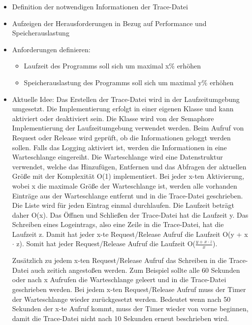 \begin{itemize}
    \item Definition der notwendigen Informationen der Trace-Datei
    \item Aufzeigen der Herausforderungen in Bezug auf Performance und
    Speicherauslastung
  \item Anforderungen definieren:
  \begin{itemize}
    \item Laufzeit des Programms soll sich um maximal x\% erhöhen
    \item Speicherauslastung des Programms soll sich um maximal y\% erhöhen
  \end{itemize}
    \item Aktuelle Idee: Das Erstellen der Trace-Datei wird in der
    Laufzeitumgebung umgesetzt. Die Implementierung erfolgt in einer eigenen
    Klasse und kann aktiviert oder deaktiviert sein. Die Klasse wird von der
    Semaphore Implementierung der Laufzeitumgebung verwendet werden. Beim Aufruf
    von Request oder Release wird geprüft, ob die Informationen geloggt werden
    sollen. Falls das Logging aktiviert ist, werden die Informationen in eine
    Warteschlange eingereiht. Die Warteschlange wird eine Datenstruktur
    verwendet, welche das Hinzufügen, Entfernen und das Abfragen der aktuellen
    Größe mit der Komplexität O(1) implementiert. Bei jeder x-ten Aktivierung,
    wobei x die maximale Größe der Warteschlange ist, werden alle vorhanden
    Einträge aus der Warteschlange entfernt und in die Trace-Datei geschrieben.
    Die Liste wird für jeden Eintrag einmal durchlaufen. Die Laufzeit beträgt
    daher O(x). Das Öffnen und Schließen der Trace-Datei hat die Laufzeit y. Das
    Schreiben eines Logeintrags, also eine Zeile in die Trace-Datei, hat die
    Laufzeit z. Damit hat jeder x-te Request/Release Aufruf die Laufzeit O(y + x
    $\cdot$ z). Somit hat jeder Request/Release Aufruf die Laufzeit O($\frac{y +
    x \cdot z}{x}$).

    Zusätzlich zu jedem x-ten Request/Release Aufruf das Schreiben in die
    Trace-Datei auch zeitich angestoßen werden. Zum Beispiel sollte alle 60
    Sekunden oder nach x Aufrufen die Warteschlange geleert und in die
    Trace-Datei geschrieben werden. Bei jedem x-ten Request/Release Aufruf muss
    der Timer der Warteschlange wieder zurückgesetzt werden. Bedeutet wenn nach
    50 Sekunden der x-te Aufruf kommt, muss der Timer wieder von vorne beginnen,
    damit die Trace-Datei nicht nach 10 Sekunden erneut beschrieben wird.


\end{itemize}
